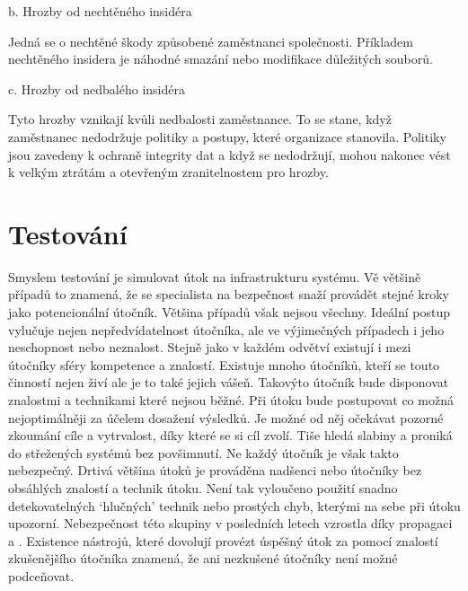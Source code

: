 b. Hrozby od nechtěného insidéra

Jedná se o nechtěné škody způsobené zaměstnanci společnosti.
Příkladem nechtěného insidera je náhodné smazání nebo modifikace důležitých souborů.

c. Hrozby od nedbalého insidéra

Tyto hrozby vznikají kvůli nedbalosti zaměstnance.
To se stane, když zaměstnanec nedodržuje politiky a postupy, které organizace stanovila.
Politiky jsou zavedeny k ochraně integrity dat a když se nedodržují, mohou nakonec vést k velkým ztrátám a otevřeným zranitelnostem pro hrozby.








\section{Testování}
Smyslem testování je simulovat útok na infrastrukturu systému.
Vě většině případů to znamená, že se specialista na bezpečnost snaží provádět stejné kroky jako potencionální útočník.
Většina případů však nejsou všechny.
Ideální postup vylučuje nejen nepředvídatelnost útočníka, ale ve výjimečných případech i jeho neschopnost nebo neznalost.
Stejně jako v každém odvětví existují i mezi útočníky sféry kompetence a znalostí.
Existuje mnoho útočníků, kteří se touto činností nejen živí ale je to také jejich vášeň.
Takovýto útočník bude disponovat znalostmi a technikami které nejsou běžné.
Při útoku bude postupovat co možná nejoptimálněji za účelem dosažení výsledků.
Je možné od něj očekávat pozorné zkoumání cíle a vytrvalost, díky které se si cíl zvolí.
Tiše hledá slabiny a proniká do střežených systémů bez povšimnutí.
Ne každý útočník je však takto nebezpečný.
Drtivá většina útoků je prováděna nadšenci nebo útočníky bez obsáhlých znalostí a technik útoku.
Není tak vyloučeno použití snadno detekovatelných `hlučných' technik nebo prostých chyb, kterými na sebe při útoku upozorní.
Nebezpečnost této skupiny v posledních letech vzrostla díky propagaci \cite{MaaS_ATaT} a \cite{RaaS_microsoft}.
Existence nástrojů, které dovolují provézt úspěšný útok za pomocí znalostí zkušenějšího útočníka znamená, že ani nezkušené útočníky není možné podceňovat.


